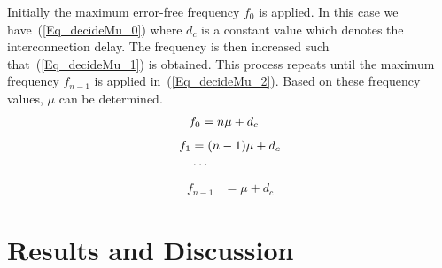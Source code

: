 \documentclass[journal]{IEEEtran}
\begin{document}
Initially the maximum error-free frequency $f_0$ is applied. In this case we have~(\ref{Eq_decideMu_0}) where $d_c$ is a constant value which denotes the interconnection delay. The frequency is then increased such that~(\ref{Eq_decideMu_1}) is obtained. This process repeats until the maximum frequency $f_{n-1}$ is applied in~(\ref{Eq_decideMu_2}). Based on these frequency values, $\mu$ can be determined.
\begin{eqnarray}\label{Eq_decideMu_0}
\vspace{-1ex}
\scriptsize
  f_0 &= n\mu+d_c
  \vspace{-12ex}
\end{eqnarray}
\vspace{-5ex}
\begin{align}\label{Eq_decideMu_1}
  f_1 &= (n-1)\mu+d_c    \\
  &\cdots               \notag
  \vspace{-3ex}
\end{align}
\vspace{-5.5ex}
\begin{eqnarray}\label{Eq_decideMu_2}
  f_{n-1} &= \mu+d_c
\end{eqnarray}
\normalsize

\section{Results and Discussion}\label{Section_Experiments}
\end{document}
